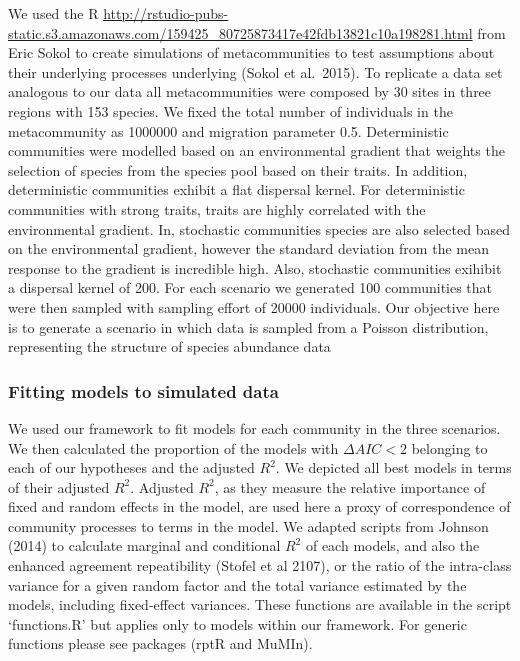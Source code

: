 We used the R
\href{package MCSIM}{http://rstudio-pubs-static.s3.amazonaws.com/159425_80725873417e42fdb13821c10a198281.html} from Eric Sokol to create simulations of metacommunities to test
assumptions about their underlying processes underlying (Sokol et
al.~2015). To replicate a data set analogous to our data all
metacommunities were composed by 30 sites in three regions with 153
species. We fixed the total number of individuals in the metacommunity
as 1000000 and migration parameter 0.5. Deterministic communities were
modelled based on an environmental gradient that weights the selection
of species from the species pool based on their traits. In addition,
deterministic communities exhibit a flat dispersal kernel. For
deterministic communities with strong traits, traits are highly
correlated with the environmental gradient. In, stochastic communities
species are also selected based on the environmental gradient, however
the standard deviation from the mean response to the gradient is
incredible high. Also, stochastic communities exihibit a dispersal
kernel of 200. For each scenario we generated 100 communities that were
then sampled with sampling effort of 20000 individuals. Our objective
here is to generate a scenario in which data is sampled from a Poisson
distribution, representing the structure of species abundance data

\subsubsection*{Fitting models to simulated
data}\label{fitting-models-to-simulated-data}

We used our framework to fit models for each community in the three
scenarios. We then calculated the proportion of the models with
\(\Delta{AIC} < 2\) belonging to each of our hypotheses and the adjusted
\(R^{2}\). We depicted all best models in terms of their adjusted
\(R^{2}\). Adjusted \(R^{2}\), as they measure the relative importance
of fixed and random effects in the model, are used here a proxy of
correspondence of community processes to terms in the model. We adapted
scripts from Johnson (2014) to calculate marginal and conditional
\(R^{2}\) of each models, and also the enhanced agreement repeatibility
(Stofel et al 2107), or the ratio of the intra-class variance for a
given random factor and the total variance estimated by the models,
including fixed-effect variances. These functions are available in the
script `functions.R' but applies only to models within our framework.
For generic functions please see packages (rptR and MuMIn).


